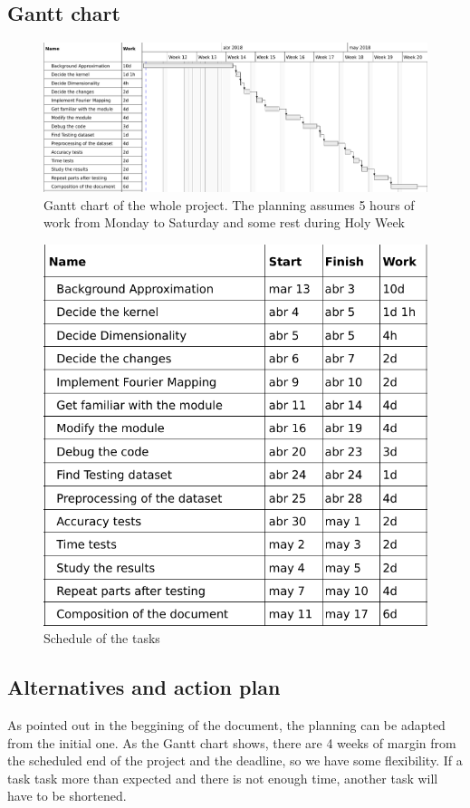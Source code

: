\documentclass[a4paper]{article}
\begin{document}
        \subsection{Gantt chart}
        \begin{figure}[H]
        \centering
        \includegraphics[width=\textwidth]{gant}
        \caption{Gantt chart of the whole project. The planning assumes 5 hours of work from Monday to Saturday and some rest during Holy Week}
        \end{figure}


        \begin{figure}[H]
        \centering
        \includegraphics[width=\textwidth]{schedule}
        \caption{Schedule of the tasks}
        \end{figure}

        \subsection{Alternatives and action plan}
        As pointed out in the beggining of the document, the planning can be adapted from the initial one. As the Gantt chart shows, there are 4 weeks of margin from the scheduled end of the project and the deadline, so we have some flexibility. If a task task more than expected and there is not enough time, another task will have to be shortened.
\end{document}
